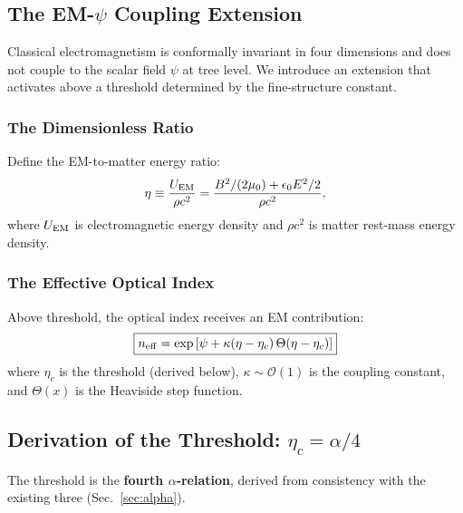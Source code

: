 \subsection{The EM-$\psi$ Coupling Extension}\label{sec:em-psi-coupling}

Classical electromagnetism is conformally invariant in four dimensions and does 
not couple to the scalar field $\psi$ at tree level. We introduce an extension 
that activates above a threshold determined by the fine-structure constant.

\subsubsection{The Dimensionless Ratio}

Define the EM-to-matter energy ratio:
\begin{equation}
\eta \equiv \frac{U_{\rm EM}}{\rho c^2} = \frac{B^2/(2\mu_0) + \epsilon_0 E^2/2}{\rho c^2},
\label{eq:eta-def}
\end{equation}
where $U_{\rm EM}$ is electromagnetic energy density and $\rho c^2$ is matter 
rest-mass energy density.

\subsubsection{The Effective Optical Index}

Above threshold, the optical index receives an EM contribution:
\begin{equation}
\boxed{n_{\rm eff} = \exp\left[\psi + \kappa(\eta - \eta_c)\,\Theta(\eta - \eta_c)\right]}
\label{eq:n-eff}
\end{equation}
where $\eta_c$ is the threshold (derived below), $\kappa \sim \mathcal{O}(1)$ is 
the coupling constant, and $\Theta(x)$ is the Heaviside step function.

\subsection{Derivation of the Threshold: $\eta_c = \alpha/4$}\label{sec:eta-derivation}

The threshold is the \textbf{fourth $\alpha$-relation}, derived from consistency 
with the existing three (Sec.~\ref{sec:alpha}).

